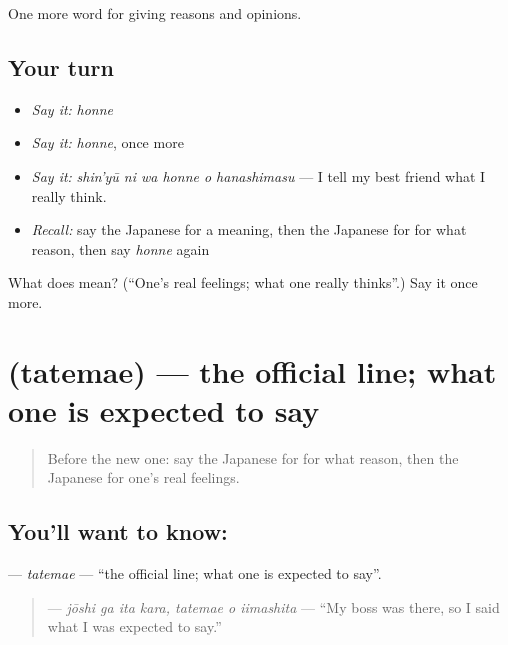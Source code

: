 \begin{grammarlens}[title={What you've built}]
One more word for giving reasons and opinions.
\end{grammarlens}

\subsection*{Your turn}
\begin{itemize}
\raggedright
  \item \emph{Say it:} \emph{honne}
  \item \emph{Say it:} \emph{honne}, once more
  \item \emph{Say it:} \emph{shin'yū ni wa honne o hanashimasu} — I tell my best friend what I really think.
  \item \emph{Recall:} say the Japanese for a meaning, then the Japanese for for what reason, then say \emph{honne} again
\end{itemize}

\begin{tcolorbox}[breakable,colback=teal!4,colframe=teal!35!black,title={Before you move on}]
What does  mean? (\textquotedblleft{}One's real feelings; what one really thinks\textquotedblright{}.) Say it once more.
\end{tcolorbox}
\section[\texorpdfstring{\ja{たてまえ} (tatemae)}{たてまえ (tatemae)}]{ (tatemae) — the official line; what one is expected to say}

\label{lesson:JA-C319-tatemae}



\begin{quote}
Before the new one: say the Japanese for for what reason, then the Japanese for one's real feelings.
\end{quote}

\subsection*{You'll want to know: }
\textbf{} — \emph{tatemae} — \textquotedblleft{}the official line; what one is expected to say\textquotedblright{}.

\begin{quote}
\textbf{  } — \emph{jōshi ga ita kara, tatemae o iimashita} — \textquotedblleft{}My boss was there, so I said what I was expected to say.\textquotedblright{}
\end{quote}

